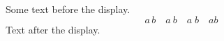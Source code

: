 \documentclass[12pt]{article}
\begin{document}
Some text before the display.
\[ a\,b \quad a\:b \quad a\;b \quad a\!b \]
Text after the display.
\end{document}
